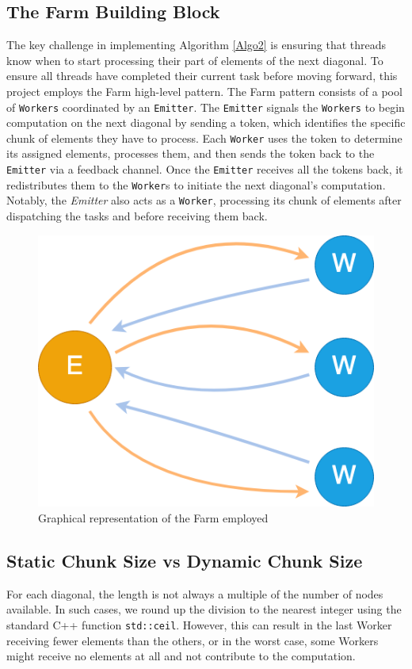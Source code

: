 \subsection*{The Farm Building Block}
The key challenge in implementing Algorithm \ref{Algo2} is ensuring that threads know when to start processing their part of elements of the next diagonal. To ensure all threads have completed their current task before moving forward, this project employs the Farm high-level pattern. The Farm pattern consists of a pool of \texttt{Workers} coordinated by an \texttt{Emitter}. The \texttt{Emitter} signals the \texttt{Workers} to begin computation on the next diagonal by sending a token, which identifies the specific chunk of elements they have to process. Each \texttt{Worker} uses the token to determine its assigned elements, processes them, and then sends the token back to the \texttt{Emitter} via a feedback channel. Once the \texttt{Emitter} receives all the tokens back, it redistributes them to the \texttt{Worker}s to initiate the next diagonal's computation. Notably, the \textit{Emitter} also acts as a \texttt{Worker}, processing its chunk of elements after dispatching the tasks and before receiving them back. 

\begin{figure}[h]
    \centering\includegraphics[scale=0.35]{img/FastFlow/Farm_graph.drawio.png}
    
    \caption{Graphical representation of the Farm employed}
\end{figure}

\subsection*{Static Chunk Size vs Dynamic Chunk Size}
For each diagonal, the length is not always a multiple of the number of nodes available. In such cases, we round up the division to the nearest integer using the standard C++ function \texttt{std::ceil}. However, this can result in the last Worker receiving fewer elements than the others, or in the worst case, some Workers might receive no elements at all and not contribute to the computation.

